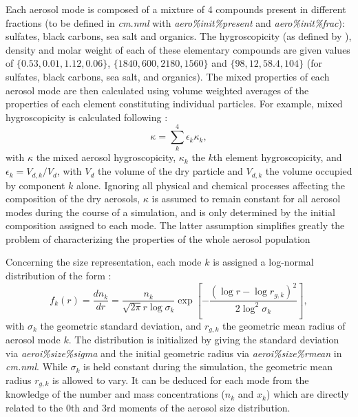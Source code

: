 \documentclass[12pt,A4,french]{article}
\begin{document}
Each aerosol mode is composed of a mixture of 4 compounds present in different fractions (to be defined in {\it cm.nml} with {\it aero\%init\%present} and {\it aero\%init\%frac}): sulfates, black carbons, sea salt and organics. The hygroscopicity (as defined by \cite{PK2007}), density and molar weight of each of these elementary compounds are given values of $\{0.53,0.01,1.12,0.06\}$, $\{1840,600,2180,1560\}$ and $\{98,12,58.4,104\}$ (for sulfates, black carbons, sea salt, and organics). The mixed properties of each aerosol mode are then calculated using volume weighted averages of the properties of each element constituting individual particles. For example, mixed hygroscopicity is calculated following \cite{PK2007}:
\begin{equation}
    \kappa = \sum_{k}^4 \epsilon_k \kappa_k,
\end{equation}
with $\kappa$ the mixed aerosol hygroscopicity, $\kappa_k$ the $k$th element hygroscopicity, and $\epsilon_k = V_{d,k}/V_d$, with $V_d$ the volume of the dry particle and $V_{d,k}$ the volume occupied by component $k$ alone. Ignoring all physical and chemical processes affecting the composition of the dry aerosols, $\kappa$ is assumed to remain constant for all aerosol modes during the course of a simulation, and is only determined by the initial composition assigned to each mode. The latter assumption simplifies greatly the problem of characterizing the properties of the whole aerosol population

Concerning the size representation, each mode $k$ is assigned a log-normal distribution of the form \cite{SP1998}:
\begin{equation}
    \label{lognorm}
    f_k\left(r\right) = \frac{dn_k}{dr} = \frac{n_k}{\sqrt{2\pi}r\log\sigma_k}\exp\left[-\frac{\left(\log r - \log r_{g,k}\right)^2}{2\log^2\sigma_k}\right],
\end{equation}
with $\sigma_k$ the geometric standard deviation, and $r_{g,k}$ the geometric mean radius of aerosol mode $k$. The distribution is initialized by giving the standard deviation via {\it aeroi\%size\%sigma} and the initial geometric radius via {\it aeroi\%size\%rmean} in {\it cm.nml}. While $\sigma_k$ is held constant during the simulation, the geometric mean radius $r_{g,k}$ is allowed to vary. It can be deduced for each mode from the knowledge of the number and mass concentrations ($n_k$ and $x_k$) which are directly related to the 0th and 3rd moments of the aerosol size distribution.
\end{document}
